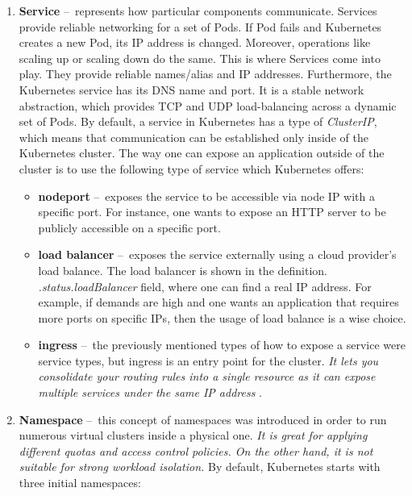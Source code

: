 \begin{enumerate}[itemsep=1mm, parsep=0pt]
    \item \textbf{Service} \---\ represents how particular components communicate.
    Services provide reliable networking for a set of Pods.
    If Pod fails and Kubernetes creates a new Pod, its IP address is changed.
    Moreover, operations like scaling up or scaling down do the same.
    This is where Services come into play.
    They provide reliable names/alias and IP addresses.
    Furthermore, the Kubernetes service has its DNS name and port.
    It is a stable network abstraction, which provides TCP and UDP load-balancing across a dynamic set of Pods.
    By default, a service in Kubernetes has a type of \emph{ClusterIP}, which means that communication can be established only inside of the Kubernetes cluster.
    The way one can expose an application outside of the cluster is to use the following type of service which Kubernetes offers:
    \begin{itemize}[itemsep=1mm, parsep=0pt]
        \item \textbf{nodeport} \---\ exposes the service to be accessible via node IP with a specific port.
        For instance, one wants to expose an HTTP server to be publicly accessible on a specific port.
        \item \textbf{load balancer} \---\  exposes the service externally using a cloud provider's load balance.
        The load balancer is shown in the definition. \emph{.status.loadBalancer} field, where one can find a real IP address.
        For example, if demands are high and one wants an application that requires more ports on specific IPs, then the usage of load balance is a wise choice.
        \item \textbf{ingress} \---\  the previously mentioned types of how to expose a service were service types, but ingress is an entry point for the cluster. \textit{It lets you consolidate your routing rules into a single resource as it can expose multiple services under the same IP address} \cite{ingress}.
    \end{itemize}

    \item \textbf{Namespace} \---\ this concept of namespaces was introduced in order to run numerous virtual clusters inside a physical one. \emph{It is great for applying different quotas and access control policies. On the other hand, it is not suitable for strong workload isolation.} By default, Kubernetes starts with three initial namespaces:


\end{enumerate}
